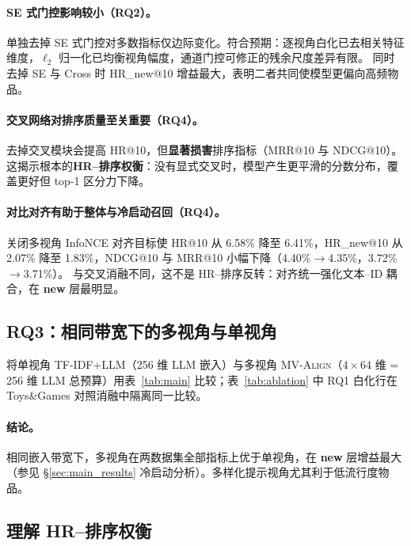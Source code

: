 \documentclass[sigconf,natbib=true,anonymous]{acmart}
\newcommand{\model}{\textsc{MV-Align}\xspace}
\begin{document}
\paragraph{SE 式门控影响较小（RQ2）。}
单独去掉 SE 式门控对多数指标仅边际变化。符合预期：逐视角白化已去相关特征维度，$\ell_2$ 归一化已均衡视角幅度，通道门控可修正的残余尺度差异有限。
同时去掉 SE 与 Cross 时 HR\_new@10 增益最大，表明二者共同使模型更偏向高频物品。

\paragraph{交叉网络对排序质量至关重要（RQ4）。}
去掉交叉模块会提高 HR@10，但\textbf{显著损害}排序指标（MRR@10 与 NDCG@10）。
这揭示根本的\textbf{HR--排序权衡}：没有显式交叉时，模型产生更平滑的分数分布，覆盖更好但 top-1 区分力下降。

\paragraph{对比对齐有助于整体与冷启动召回（RQ4）。}
关闭多视角 InfoNCE 对齐目标使 HR@10 从 6.58\% 降至 6.41\%，HR\_new@10 从 2.07\% 降至 1.83\%，NDCG@10 与 MRR@10 小幅下降（4.40\%$\rightarrow$4.35\%，3.72\%$\rightarrow$3.71\%）。
与交叉消融不同，这不是 HR--排序反转：对齐统一强化文本--ID 耦合，在 \textbf{new} 层最明显。

\subsection{RQ3：相同带宽下的多视角与单视角}

将单视角 TF-IDF+LLM（256 维 LLM 嵌入）与多视角 \model（$4\times 64$ 维 = 256 维 LLM 总预算）用表~\ref{tab:main} 比较；表~\ref{tab:ablation} 中 RQ1 白化行在 Toys\&Games 对照消融中隔离同一比较。

\paragraph{结论。}
相同嵌入带宽下，多视角在两数据集全部指标上优于单视角，在 \textbf{new} 层增益最大（参见 \S\ref{sec:main_results} 冷启动分析）。多样化提示视角尤其利于低流行度物品。

\subsection{理解 HR--排序权衡}
\end{document}
